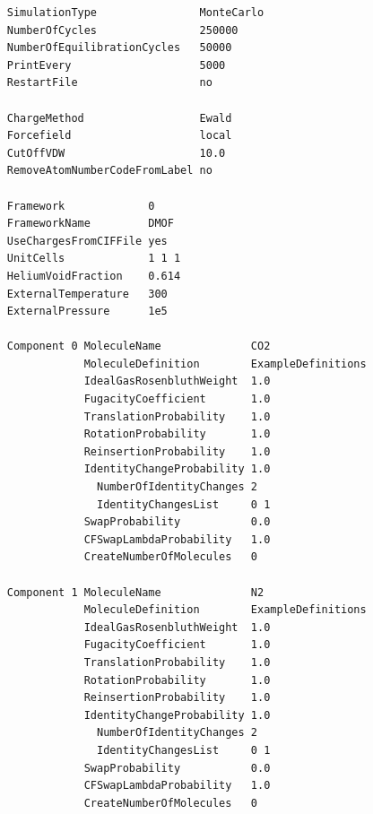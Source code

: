 \begin{tiny}
\begin{verbatim}
     SimulationType                MonteCarlo
     NumberOfCycles                250000
     NumberOfEquilibrationCycles   50000
     PrintEvery                    5000
     RestartFile                   no
     
     ChargeMethod                  Ewald
     Forcefield                    local
     CutOffVDW                     10.0
     RemoveAtomNumberCodeFromLabel no
     
     Framework             0
     FrameworkName         DMOF
     UseChargesFromCIFFile yes
     UnitCells             1 1 1
     HeliumVoidFraction    0.614
     ExternalTemperature   300
     ExternalPressure      1e5
     
     Component 0 MoleculeName              CO2
                 MoleculeDefinition        ExampleDefinitions
                 IdealGasRosenbluthWeight  1.0
                 FugacityCoefficient       1.0
                 TranslationProbability    1.0
                 RotationProbability       1.0
                 ReinsertionProbability    1.0
                 IdentityChangeProbability 1.0
                   NumberOfIdentityChanges 2
                   IdentityChangesList     0 1
                 SwapProbability           0.0
                 CFSwapLambdaProbability   1.0
                 CreateNumberOfMolecules   0
     
     Component 1 MoleculeName              N2
                 MoleculeDefinition        ExampleDefinitions
                 IdealGasRosenbluthWeight  1.0
                 FugacityCoefficient       1.0
                 TranslationProbability    1.0
                 RotationProbability       1.0
                 ReinsertionProbability    1.0
                 IdentityChangeProbability 1.0
                   NumberOfIdentityChanges 2
                   IdentityChangesList     0 1
                 SwapProbability           0.0
                 CFSwapLambdaProbability   1.0
                 CreateNumberOfMolecules   0
\end{verbatim}
\end{tiny}


